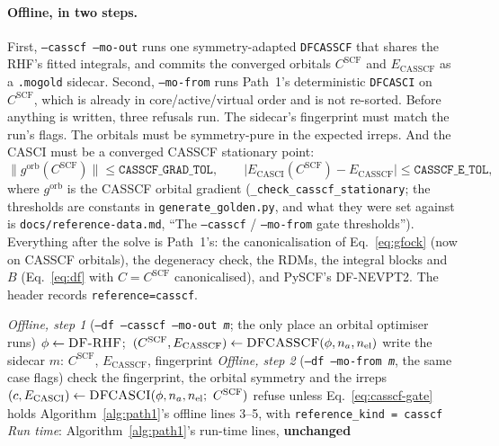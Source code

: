\documentclass[11pt]{article}
\newcommand{\code}[1]{\texttt{#1}}
\begin{document}
\paragraph{Offline, in two steps.} First, \code{--casscf --mo-out} runs one
symmetry-adapted \code{DFCASSCF} that shares the RHF's fitted integrals, and
commits the converged orbitals $C^{\mathrm{SCF}}$ and $E_{\mathrm{CASSCF}}$
as a \code{.mogold} sidecar. Second, \code{--mo-from} runs Path~1's
deterministic \code{DFCASCI} on $C^{\mathrm{SCF}}$, which is already in
core/active/virtual order and is not re-sorted. Before anything is written,
three refusals run. The sidecar's fingerprint must match the run's flags.
The orbitals must be symmetry-pure in the expected irreps. And the CASCI
must be a converged CASSCF stationary point:
\begin{equation}
  \bigl\| g^{\mathrm{orb}}(C^{\mathrm{SCF}}) \bigr\| \le \code{CASSCF\_GRAD\_TOL},
  \qquad
  \bigl| E_{\mathrm{CASCI}}(C^{\mathrm{SCF}}) - E_{\mathrm{CASSCF}} \bigr| \le \code{CASSCF\_E\_TOL},
  \label{eq:casscf-gate}
\end{equation}
where $g^{\mathrm{orb}}$ is the CASSCF orbital gradient
(\code{\_check\_casscf\_stationary}; the thresholds are constants in
\code{generate\_golden.py}, and what they were set against is
\code{docs/reference-data.md}, ``The \code{--casscf} / \code{--mo-from} gate
thresholds''). Everything after the solve is Path~1's: the canonicalisation of
Eq.~\eqref{eq:gfock} (now on CASSCF orbitals), the degeneracy check, the
RDMs, the integral blocks and $B$ (Eq.~\eqref{eq:df} with $C = C^{\mathrm{SCF}}$
canonicalised), and PySCF's DF-NEVPT2. The header records
\code{reference=casscf}.

\begin{algorithm}[htbp]
\caption{Path 3, SC on CASSCF orbitals}
\label{alg:path3}
\begin{algorithmic}[1]
\Statex \textit{Offline, step 1} (\code{--df --casscf --mo-out \textit{m}}; the only place an orbital optimiser runs)
\State $\phi \gets \textsc{DF-RHF}$;\ $(C^{\mathrm{SCF}}, E_{\mathrm{CASSCF}}) \gets \textsc{DFCASSCF}(\phi, n_a, n_{\mathrm{el}})$
\State write the sidecar $m$: $C^{\mathrm{SCF}}$, $E_{\mathrm{CASSCF}}$, fingerprint
\Statex \textit{Offline, step 2} (\code{--df --mo-from \textit{m}}, the same case flags)
\State check the fingerprint, the orbital symmetry and the irreps
\State $(c, E_{\mathrm{CASCI}}) \gets \textsc{DFCASCI}(\phi, n_a, n_{\mathrm{el}};\ C^{\mathrm{SCF}})$
\State refuse unless Eq.~\eqref{eq:casscf-gate} holds
\State Algorithm~\ref{alg:path1}'s offline lines 3--5, with \code{reference\_kind = casscf}
\Statex \textit{Run time}: Algorithm~\ref{alg:path1}'s run-time lines, \textbf{unchanged}
\end{algorithmic}
\end{algorithm}
\end{document}
